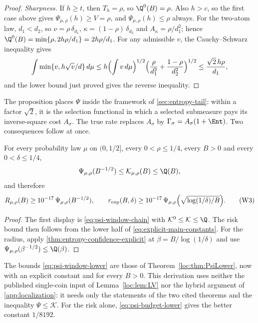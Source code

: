 \begin{proof}
\emph{Sharpness.} If $h\ge t$, then $T_h=\rho$, so $\Q^0(B)=\rho$. Also
$h>c$, so the first case above gives $\Psi_{\mu,\rho}(h)\ge V=\rho$, and
$\Psi_{\mu,\rho}(h)\le\rho$ always. For the two-atom law, $d_1<d_2$, so
$\nu=\rho\,\delta_{d_1}$, $\kappa=(1-\rho)\,\delta_{d_2}$ and
$A_\kappa=\rho/d_1^2$; hence $\Q^0(B)=\min\{\rho,2h\rho/d_1\}=2h\rho/d_1$.
For any admissible $v$, the Cauchy--Schwarz inequality gives
\[
 \int\min\{v,h\sqrt v/d\}\,d\mu
 \le h\Bigl(\int v\,d\mu\Bigr)^{1/2}
      \Bigl(\frac{\rho}{d_1^2}+\frac{1-\rho}{d_2^2}\Bigr)^{1/2}
 \le\frac{\sqrt2\,h\rho}{d_1},
\]
and the lower bound just proved gives the reverse inequality.
\end{proof}

The proposition places $\Psi$ inside the framework of \cref{sec:entropy-tail}:
within a factor $\sqrt2$, it is the selection functional in which a
selected submeasure pays its inverse-square cost $A_\sigma$. The true rate
replaces $A_\sigma$ by $\Gamma_\sigma=A_\sigma(1+\Ent)$. Two consequences
follow at once.

\begin{corollary}
\label{cor:psi-from-law}
For every probability law $\mu$ on $(0,1/2]$, every $0<\rho\le1/4$, every
$B>0$ and every $0<\delta\le1/4$,
\[
 \Psi_{\mu,\rho}(B^{-1/2})\le\mathcal K_{\mu,\rho}(B)\le\Q(B),
\]
and therefore
\[
 R_{\mu,\rho}(B)\ge10^{-17}\,\Psi_{\mu,\rho}(B^{-1/2}),\qquad
 r_{\rm exp}(B,\delta)\ge10^{-17}\,
 \Psi_{\mu,\rho}\Bigl(\sqrt{\log(1/\delta)/B}\Bigr).
 \tag{W3}\label{eq:psi-window-lower}
\]
\end{corollary}

\begin{proof}
The first display is \eqref{eq:psi-window-chain} with
$\mathcal K^0\le\mathcal K\le\Q$. The risk bound then follows from the
lower half of \eqref{eq:explicit-main-constants}. For the radius, apply
\cref{thm:entropy-confidence-explicit} at $\beta=B/\log(1/\delta)$ and use
$\Psi_{\mu,\rho}(\beta^{-1/2})\le\Q(\beta)$.
\end{proof}

The bounds \eqref{eq:psi-window-lower} are those of
Theorem~\ref{loc:thm:PsiLower}, now with an explicit constant and for
every $B>0$. This derivation uses neither the published single-coin
input of Lemma~\ref{loc:lem:LV} nor the hybrid argument of
\cref{app:localization}: it needs only the statements of the two cited
theorems and the inequality $\Psi\le\mathcal K$. For the risk alone,
\eqref{eq:psi-budget-lower} gives the better constant $1/8192$.

